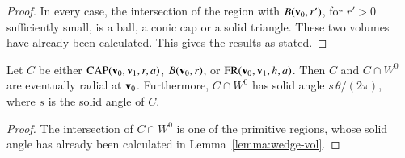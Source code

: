 \begin{proof} In every case, the intersection of 
the region with $B({\mathbf v}_0,r')$, for $r'>0$ sufficiently small, is a ball,
a conic cap or a solid triangle.  These two volumes have
already been calculated.  This gives the results as stated.
\end{proof}

\begin{lemma}\label{lemma:wedge-sol}  
Let $C$ be either ${\operatorname{CAP}}({\mathbf v}_0,{\mathbf v}_1,r,a)$, $B({\mathbf v}_0,r)$, or
${\operatorname{FR}}({\mathbf v}_0,{\mathbf v}_1,h,a)$.  Then $C$ and $C\cap W^0$ are eventually
radial at ${\mathbf v}_0$. Furthermore, $C\cap W^0$ has solid angle
$s\,\theta/(2\pi)$, where $s$ is the solid angle of $C$.
\end{lemma}

\begin{proof} The intersection of $C\cap W^0$ is one of the primitive
  regions, whose solid angle has already been calculated in
  Lemma~\ref{lemma:wedge-vol}.
\end{proof}



